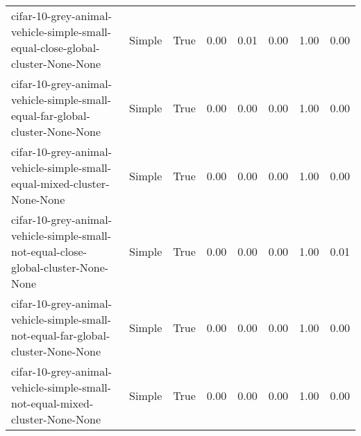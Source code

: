 \begin{longtable}{llllllll}
                               cifar-10-grey-animal-vehicle-simple-small-equal-close-global-cluster-None-None &       Simple &        True &                 0.00 &                 0.01 &                         0.00 &                         1.00 &                         0.00 \\
                                 cifar-10-grey-animal-vehicle-simple-small-equal-far-global-cluster-None-None &       Simple &        True &                 0.00 &                 0.00 &                         0.00 &                         1.00 &                         0.00 \\
                                      cifar-10-grey-animal-vehicle-simple-small-equal-mixed-cluster-None-None &       Simple &        True &                 0.00 &                 0.00 &                         0.00 &                         1.00 &                         0.00 \\
                           cifar-10-grey-animal-vehicle-simple-small-not-equal-close-global-cluster-None-None &       Simple &        True &                 0.00 &                 0.00 &                         0.00 &                         1.00 &                         0.01 \\
                             cifar-10-grey-animal-vehicle-simple-small-not-equal-far-global-cluster-None-None &       Simple &        True &                 0.00 &                 0.00 &                         0.00 &                         1.00 &                         0.00 \\
                                  cifar-10-grey-animal-vehicle-simple-small-not-equal-mixed-cluster-None-None &       Simple &        True &                 0.00 &                 0.00 &                         0.00 &                         1.00 &                         0.00 \\
\end{longtable}
